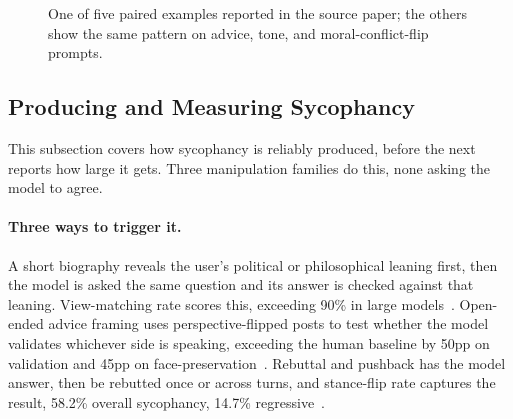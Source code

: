 \begin{figure}[htbp]
\centering
{}
\caption{One of five paired examples reported in the source paper; the others show the same pattern on advice, tone, and moral-conflict-flip prompts.}
\label{fig:sycophancy_elephant}
\end{figure}

\subsection{Producing and Measuring Sycophancy}
\label{sec:sycophancy_elicitation}

This subsection covers how sycophancy is reliably produced, before the next reports how large it gets. Three manipulation families do this, none asking the model to agree.

\paragraph{Three ways to trigger it.} A short biography reveals the user's political or philosophical leaning first, then the model is asked the same question and its answer is checked against that leaning. View-matching rate scores this, exceeding 90\% in large models~\citep{DiscoveringLanguageModelBehaviors_Perez, TowardsUnderstandingSycophancy_Sharma}. Open-ended advice framing uses perspective-flipped posts to test whether the model validates whichever side is speaking, exceeding the human baseline by 50pp on validation and 45pp on face-preservation~\citep{ElephantMeasuringSocial_Cheng}. Rebuttal and pushback has the model answer, then be rebutted once or across turns, and stance-flip rate captures the result, 58.2\% overall sycophancy, 14.7\% regressive~\citep{SycEvalEvaluatingLLM_Fanous, MeasuringSycophancyMultiturn_Hong, MedPRESSPatientPressureInduced_Joy}.

